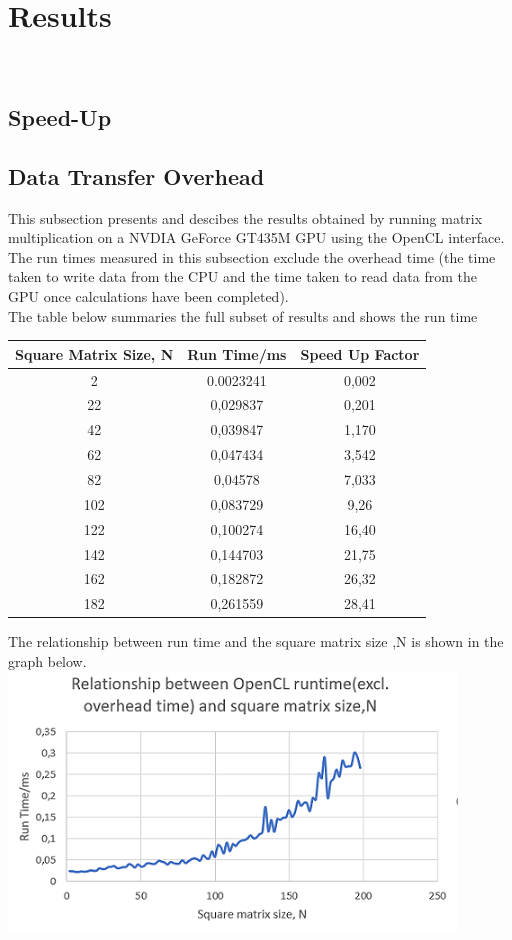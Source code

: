 \section{Results}

\\
\subsection{Speed-Up}

\subsection{Data Transfer Overhead}
This subsection presents and descibes the results obtained by running matrix multiplication on a NVDIA GeForce GT435M GPU using the OpenCL interface. The run times measured in this subsection exclude the overhead time (the time taken to write data from the CPU and the time taken to read data from the GPU once calculations have been completed). 
\\
The table below summaries the full subset of results and shows the run time 
\begin{center}
	\begin{tabular}{||c c c||} 
		\hline
		Square Matrix Size, N &  Run Time/ms & Speed Up Factor \\ [0.1ex] 
		\hline\hline
		2 &	0.0023241 & 0,002\\
		\hline
		22 & 0,029837 & 0,201\\
		\hline
		42 & 0,039847 & 1,170\\
		\hline
		62 & 0,047434 & 3,542\\
		\hline
		82 & 0,04578 & 7,033\\
		\hline
		102	& 0,083729 & 9,26\\
		\hline
	    122	& 0,100274 & 16,40\\
		\hline
		142	& 0,144703 & 21,75\\
		\hline
		162	& 0,182872 & 26,32\\
		\hline
		182	& 0,261559 & 28,41\\
		\hline
		
	\end{tabular}
\end{center}

The relationship between run time and the square matrix size ,N is shown in the graph below.
\\
\vspace{2mm}
\includegraphics{Figures/part2.PNG}

